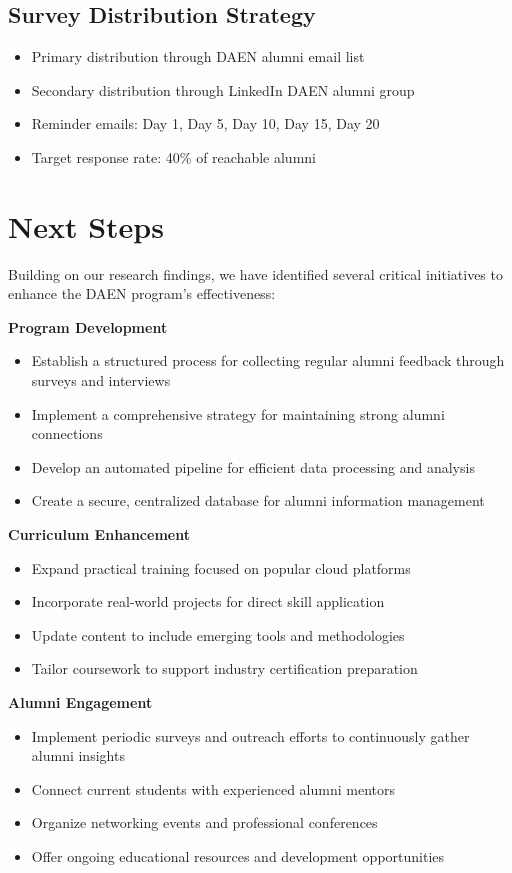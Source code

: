 \documentclass[12pt,a4paper]{article}
\begin{document}
\subsection{Survey Distribution Strategy}
\begin{itemize}
    \item Primary distribution through DAEN alumni email list
    \item Secondary distribution through LinkedIn DAEN alumni group
    \item Reminder emails: Day 1, Day 5, Day 10, Day 15, Day 20
    \item Target response rate: 40\% of reachable alumni
\end{itemize}

\newpage

\section{Next Steps}
Building on our research findings, we have identified several critical initiatives to enhance the DAEN program's effectiveness:

\noindent\textbf{Program Development}
\begin{itemize}
\item Establish a structured process for collecting regular alumni feedback through surveys and interviews
\item Implement a comprehensive strategy for maintaining strong alumni connections
\item Develop an automated pipeline for efficient data processing and analysis
\item Create a secure, centralized database for alumni information management
\end{itemize}
\textbf{Curriculum Enhancement}
\begin{itemize}
\item Expand practical training focused on popular cloud platforms
\item Incorporate real-world projects for direct skill application
\item Update content to include emerging tools and methodologies
\item Tailor coursework to support industry certification preparation
\end{itemize}
\textbf{Alumni Engagement}
\begin{itemize}
\item Implement periodic surveys and outreach efforts to continuously gather alumni insights
\item Connect current students with experienced alumni mentors
\item Organize networking events and professional conferences
\item Offer ongoing educational resources and development opportunities
\end{itemize}
\end{document}
